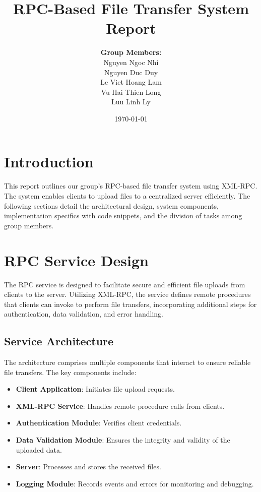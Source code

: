 \documentclass[12pt]{article}
\title{RPC-Based File Transfer System Report}
\author{
    \textbf{Group Members:} \\
    Nguyen Ngoc Nhi \\
    Nguyen Duc Duy \\
    Le Viet Hoang Lam \\
    Vu Hai Thien Long \\
    Luu Linh Ly
}
\date{\today}
\begin{document}
\maketitle

\tableofcontents
\newpage

\section{Introduction}
This report outlines our group's RPC-based file transfer system using XML-RPC. The system enables clients to upload files to a centralized server efficiently. The following sections detail the architectural design, system components, implementation specifics with code snippets, and the division of tasks among group members.

\section{RPC Service Design}
The RPC service is designed to facilitate secure and efficient file uploads from clients to the server. Utilizing XML-RPC, the service defines remote procedures that clients can invoke to perform file transfers, incorporating additional steps for authentication, data validation, and error handling.

\subsection{Service Architecture}
The architecture comprises multiple components that interact to ensure reliable file transfers. The key components include:

\begin{itemize}
    \item \textbf{Client Application}: Initiates file upload requests.
    \item \textbf{XML-RPC Service}: Handles remote procedure calls from clients.
    \item \textbf{Authentication Module}: Verifies client credentials.
    \item \textbf{Data Validation Module}: Ensures the integrity and validity of the uploaded data.
    \item \textbf{Server}: Processes and stores the received files.
    \item \textbf{Logging Module}: Records events and errors for monitoring and debugging.
\end{itemize}
\end{document}
